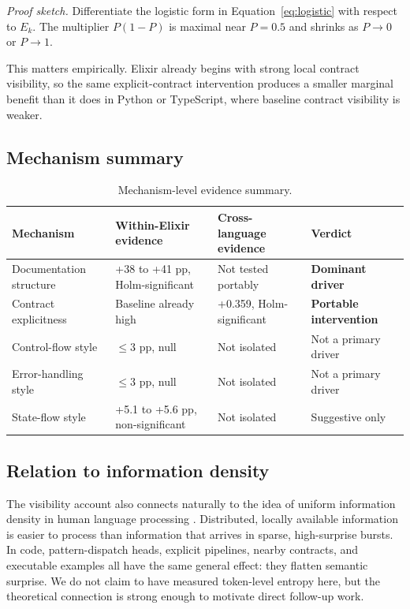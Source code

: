 \documentclass[11pt]{article}
\newcommand{\pp}{pp}
\newcommand{\elixir}{Elixir}
\newcommand{\pythonlang}{Python}
\newcommand{\tslang}{TypeScript}
\begin{document}
\textit{Proof sketch.} Differentiate the logistic form in Equation~\eqref{eq:logistic} with respect to $E_k$. The multiplier $P(1-P)$ is maximal near $P=0.5$ and shrinks as $P \to 0$ or $P \to 1$.

This matters empirically. \elixir{} already begins with strong local contract visibility, so the same explicit-contract intervention produces a smaller marginal benefit than it does in \pythonlang{} or \tslang{}, where baseline contract visibility is weaker.

\subsection{Mechanism summary}

\begin{table}[H]
\centering
\caption{Mechanism-level evidence summary.}
\label{tab:mechanisms}
\small
\begin{tabular}{>{\raggedright\arraybackslash}p{}
                >{\raggedright\arraybackslash}p{}
                >{\raggedright\arraybackslash}p{}
                >{\raggedright\arraybackslash}p{}}
\toprule
Mechanism & Within-Elixir evidence & Cross-language evidence & Verdict \\
\midrule
Documentation structure & +38 to +41 \pp{}, Holm-significant & Not tested portably & \textbf{Dominant driver} \\
Contract explicitness & Baseline already high & +0.359, Holm-significant & \textbf{Portable intervention} \\
Control-flow style & $\leq 3$ \pp{}, null & Not isolated & Not a primary driver \\
Error-handling style & $\leq 3$ \pp{}, null & Not isolated & Not a primary driver \\
State-flow style & +5.1 to +5.6 \pp{}, non-significant & Not isolated & Suggestive only \\
\bottomrule
\end{tabular}
\end{table}

\subsection{Relation to information density}

The visibility account also connects naturally to the idea of uniform information density in human language processing \cite{jaeger2010}. Distributed, locally available information is easier to process than information that arrives in sparse, high-surprise bursts. In code, pattern-dispatch heads, explicit pipelines, nearby contracts, and executable examples all have the same general effect: they flatten semantic surprise. We do not claim to have measured token-level entropy here, but the theoretical connection is strong enough to motivate direct follow-up work.
\end{document}
